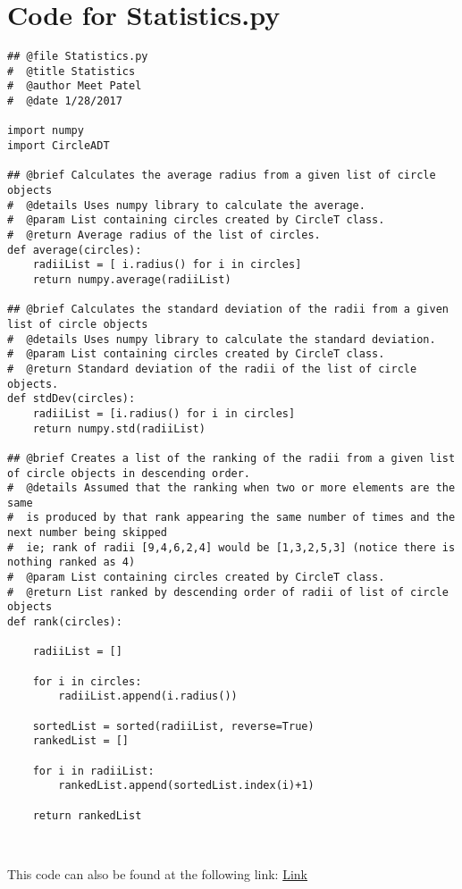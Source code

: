 \documentclass[12pt]{article}
\begin{document}
\section{Code for Statistics.py} \label{MyStatsSect}
\begin{lstlisting}
## @file Statistics.py
#  @title Statistics
#  @author Meet Patel
#  @date 1/28/2017

import numpy 
import CircleADT

## @brief Calculates the average radius from a given list of circle objects
#  @details Uses numpy library to calculate the average.
#  @param List containing circles created by CircleT class.
#  @return Average radius of the list of circles.
def average(circles):
    radiiList = [ i.radius() for i in circles]
    return numpy.average(radiiList) 

## @brief Calculates the standard deviation of the radii from a given list of circle objects
#  @details Uses numpy library to calculate the standard deviation.
#  @param List containing circles created by CircleT class.
#  @return Standard deviation of the radii of the list of circle objects.
def stdDev(circles):
    radiiList = [i.radius() for i in circles]
    return numpy.std(radiiList)

## @brief Creates a list of the ranking of the radii from a given list of circle objects in descending order.
#  @details Assumed that the ranking when two or more elements are the same
#  is produced by that rank appearing the same number of times and the next number being skipped
#  ie; rank of radii [9,4,6,2,4] would be [1,3,2,5,3] (notice there is nothing ranked as 4)
#  @param List containing circles created by CircleT class.
#  @return List ranked by descending order of radii of list of circle objects
def rank(circles):
    
    radiiList = []
    
    for i in circles:
        radiiList.append(i.radius())
        
    sortedList = sorted(radiiList, reverse=True)
    rankedList = []
    
    for i in radiiList:
        rankedList.append(sortedList.index(i)+1)
        
    return rankedList
\end{lstlisting}

~\newline

\noindent This code can also be found at the following link:
\href{https://gitlab.cas.mcmaster.ca/se2aa4_cs2me3_assignments/patelm16/blob/master/A1/src/Statistics.py}{Link}
\end{document}
